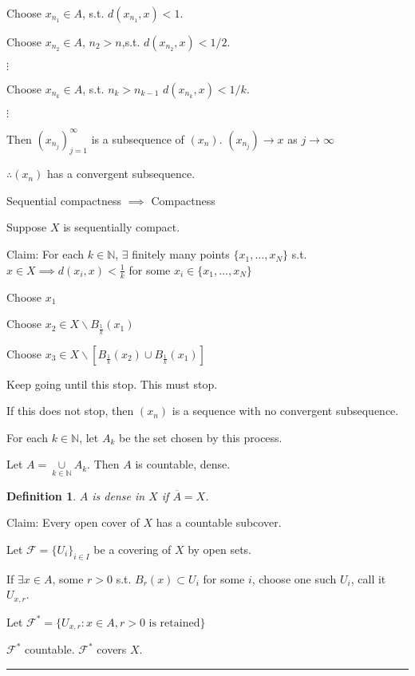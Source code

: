 \documentclass[twoside]{article}
\newcommand{\N}{\mathbb{N}}
\newtheorem{definition}[theorem]{Definition}
\newenvironment{proof}{{\bf Proof:}}{\hfill\rule{2mm}{2mm}}
\begin{document}
\begin{proof}
    Choose $x_{n_1} \in A$, s.t. $d(x_{n_1}, x) < 1$.

    Choose  $x_{n_2} \in A$, $n_2 > n$,s.t. $d(x_{n_2}, x) < 1/2$.

    $\vdots$

    Choose  $x_{n_k} \in A$, s.t. $n_{k} > n_{k-1} $ $d(x_{n_k}, x) < 1/k$.


    $\vdots$

    Then $(x_{n_j})_{j=1}^\infty$ is a subsequence of $(x_n)$. $(x_{n_j}) \rightarrow x$ as $j \rightarrow \infty$

    $\therefore (x_n)$ has a convergent subsequence. 

    \medskip

    Sequential compactness $\implies$ Compactness

    Suppose $X$ is sequentially compact. 

    Claim: For each $k \in \N$, $\exists$ finitely many points $\{x_1, \dots, x_N\}$ s.t. $x \in X \implies d(x_i,x) < \frac1k$ for some $x_i \in \{x_1, \dots, x_N\}$

    Choose $x_1$

    Choose $x_2 \in X \backslash B_{\frac1k}(x_1)$

    Choose $x_3 \in X \backslash [B_{\frac1k}(x_2) \cup B_{\frac1k}(x_1)]$


    Keep going until this stop. This must stop. 

    If this does not stop, then $(x_n)$ is a sequence with no convergent subsequence.

    For each $k \in \N$, let $A_k$ be the set chosen by this process. 

    Let $A = \underset{k\in\N}\cup A_k$. Then $A$ is countable, dense.

    \begin{definition}
        $A$ is dense in $X$ if $\overline A = X$.       
    \end{definition}    
 
    Claim: Every open cover of $X$ has a countable subcover. 

    Let $\mathcal F = \{U_i\}_{i \in I}$ be a covering of $X$ by open sets. 

    If $\exists x \in A$, some $r > 0$ s.t. $B_r(x) \subset U_i$ for some $i$, choose one such $U_i$, call it $U_{x,r}$. 
    
    Let $\mathcal{F^*} = \{ U_{x,r} : x \in A, r > 0 \text{ is retained} \}$

    $\mathcal{F^*}$ countable. 
    $\mathcal{F^*}$ covers $X$.


\end{proof}
\end{document}
